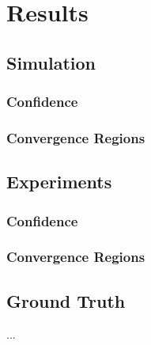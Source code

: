 \chapter{Results}
\label{chap:simulation_results}

\section{Simulation}
\subsection{Confidence}

\subsection{Convergence Regions}

\section{Experiments}
\subsection{Confidence}

\subsection{Convergence Regions}

\section{Ground Truth}

...